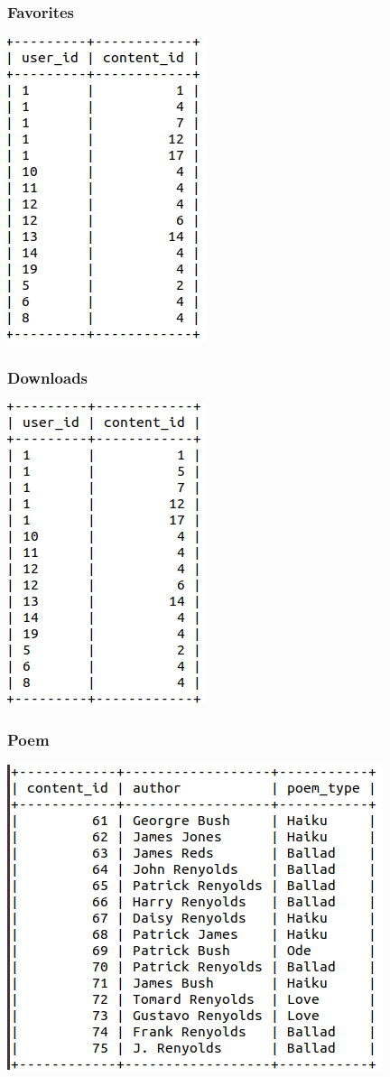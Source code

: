 \documentclass[letter, 12pt, titlepage]{article}
\begin{document}
		\subsubsection{Favorites}
			\includegraphics[scale=.5]{favorites.png}
		\subsubsection{Downloads}
			\includegraphics[scale=.5]{downloads.png}
		\subsubsection{Poem}
			\includegraphics[scale=.45]{poem.png}
\end{document}
